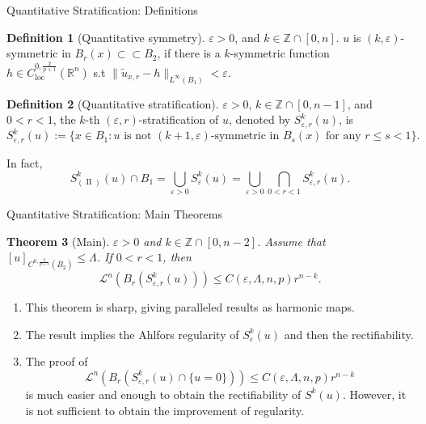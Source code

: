 \documentclass[11pt]{beamer}
\newcommand{\va}{\varepsilon}
\newcommand{\Lda}{\Lambda}
\newcommand{\cL}{\mathcal{L}}
\newcommand{\Z}{\mathbb{Z}}
\newcommand{\R}{\mathbb{R}}
\newcommand{\ift}{\infty}
\newcommand{\wt}{\widetilde}
\newcommand{\f}{\frac}
\newcommand{\ol}{\overline}
\newcommand{\op}{\operatorname}
\DeclareMathOperator{\loc}{loc}
\theoremstyle{plain}
\newtheorem{thm}{Theorem}
\theoremstyle{definition}
\newtheorem{defn}[thm]{Definition}
\begin{document}
\begin{frame}{Quantitative Stratification: Definitions}

\begin{defn}[Quantitative symmetry]
$ \va>0 $, and $ k\in\Z\cap[0,n] $. $ u $ is $ (k,\va) $-symmetric in $ B_r(x)\subset\subset B_2 $, if there is a $ k $-symmetric function $ h\in C_{\loc}^{0,\f{2}{p+1}}(\R^n) $ s.t $
\|\wt{u}_{x,r}-h\|_{L^{\ift}(B_1)}<\va $.
\end{defn}\pause

\begin{defn}[Quantitative stratification]\label{defSkvarMEMS}
$ \va>0 $, $ k\in\Z\cap[0,n-1] $, and $ 0<r<1 $, the $ k $-th $ (\va,r) $-stratification of $ u $, denoted by $ S_{\va,r}^k(u) $, is
$$
S_{\va,r}^k(u):=\{x\in B_1:u\text{ is not }(k+1,\va)\text{-symmetric in }B_s(x)\text{ for any }r\leq s<1\}.
$$
\end{defn}\pause

In fact,
$$
S_{(\op{II})}^k(u)\cap B_1=\bigcup_{\va>0}S_{\va}^k(u)=\bigcup_{\va>0}\bigcap_{0<r<1}S_{\va,r}^k(u).
$$
\end{frame}

\begin{frame}{Quantitative Stratification: Main Theorems}
\begin{thm}[Main]
$ \va>0 $ and $ k\in\Z\cap[0,n-2] $. Assume that $ [u]_{C^{0,\f{2}{p+1}}(\ol{B}_2)}\leq\Lda $. If $ 0<r<1 $, then
$$
\cL^n(B_r(S_{\va,r}^k(u)))\leq C(\va,\Lda,n,p)r^{n-k}.
$$
\end{thm}\pause

\begin{enumerate}
\item This theorem is sharp, giving paralleled results as harmonic maps.\pause
\item The result implies the Ahlfors regularity of $ S_{\va}^k(u) $ and then the rectifiability.\pause
\item The proof of
$$
\cL^n(B_r(S_{\va,r}^k(u)\cap\{u=0\}))\leq C(\va,\Lda,n,p)r^{n-k}
$$
is much easier and enough to obtain the rectifiability of $ S^k(u) $. However, it is not sufficient to obtain the improvement of regularity.
\end{enumerate}

\end{frame}
\end{document}

